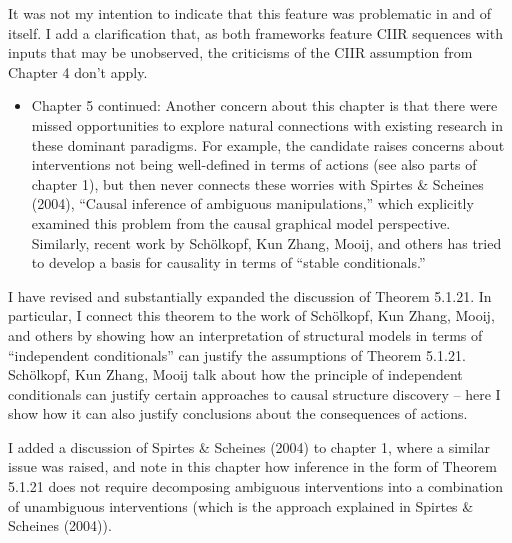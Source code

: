 It was not my intention to indicate that this feature was problematic in and of itself. I add a clarification that, as both frameworks feature CIIR sequences with inputs that may be unobserved, the criticisms of the CIIR assumption from Chapter 4 don't apply.

\begin{itemize}
    \item Chapter 5 continued: Another concern about this chapter is that there were missed opportunities to explore natural connections with existing research in these dominant paradigms. For example, the candidate raises concerns about interventions not being well-defined in terms of actions (see also parts of chapter 1), but then never connects these worries with Spirtes \& Scheines (2004), “Causal inference of ambiguous manipulations,” which explicitly examined this problem from the causal graphical model perspective. Similarly, recent work by Schölkopf, Kun Zhang, Mooij, and others has tried to develop a basis for causality in terms of “stable conditionals.”
\end{itemize}

I have revised and substantially expanded the discussion of Theorem 5.1.21. In particular, I connect this theorem to the work of Schölkopf, Kun Zhang, Mooij, and others by showing how an interpretation of structural models in terms of ``independent conditionals'' can justify the assumptions of Theorem 5.1.21. Schölkopf, Kun Zhang, Mooij talk about how the principle of independent conditionals can justify certain approaches to causal structure discovery -- here I show how it can also justify conclusions about the consequences of actions.

I added a discussion of Spirtes \& Scheines (2004) to chapter 1, where a similar issue was raised, and note in this chapter how inference in the form of Theorem 5.1.21 does not require decomposing ambiguous interventions into a combination of unambiguous interventions (which is the approach explained in Spirtes \& Scheines (2004)).